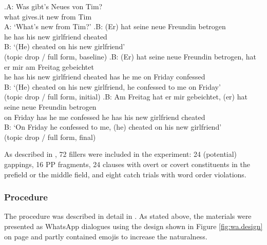 \exg.\label{ex:item.embedded}A: Was gibt's Neues von Tim?\\
{} what gives.it new from Tim\\
A: `What's new from Tim?'
\ag.\label{ex:item.embedded.no}B: (Er) hat seine neue Freundin betrogen\\
{} he has his new girlfriend cheated \\
B: `(He) cheated on his new girlfriend' \\\phantom{.}\hfill (topic drop / full form, baseline)
\bg.\label{ex:item.embedded.initial}B: (Er) hat seine neue Freundin betrogen, hat er mir am Freitag gebeichtet\\
{} he has his new girlfriend cheated has he me on Friday confessed\\
B: `(He) cheated on his new girlfriend, he confessed to me on Friday' \\\phantom{.}\hfill (topic drop / full form, initial)
\bg.\label{ex:item.embedded.final}B: Am Freitag hat er mir gebeichtet, (er) hat seine neue Freundin betrogen\\
{} on Friday has he me confessed he has his new girlfriend cheated\\
B: `On Friday he confessed to me, (he) cheated on his new girlfriend' \\\phantom{.}\hfill (topic drop / full form, final)


As described in , 72 fillers were included in the experiment:
24 (potential) gappings, 16 PP fragments, 24 clauses with overt or covert constituents in the prefield or the middle field, and eight catch trials with word order violations.

\subsubsection{Procedure}
The procedure was described in detail in .
As stated above, the materials were presented as WhatsApp dialogues using the design shown in Figure \ref{fig:wa.design} on page \pageref{fig:wa.design} and partly contained emojis to increase the naturalness.


